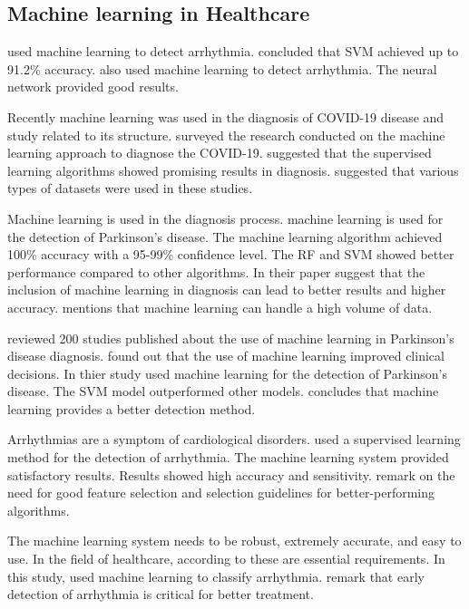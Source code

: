 \subsection{Machine learning in Healthcare}\label{subsec:machine_learning_in_healthcare}

\cite{ref_paper_38} used machine learning to detect arrhythmia. \cite{ref_paper_38} concluded that SVM achieved up to 91.2\% accuracy. \cite{ref_paper_16} also used machine learning to detect arrhythmia. The neural network provided good results.

Recently machine learning was used in the diagnosis of COVID-19 disease and study related to its structure. \cite{ref_paper_20} surveyed the research conducted on the machine learning approach to diagnose the COVID-19. \cite{ref_paper_20} suggested that the supervised learning algorithms showed promising results in diagnosis. \cite{ref_paper_20} suggested that various types of datasets were used in these studies.

Machine learning is used in the diagnosis process. \cite{ref_paper_34} machine learning is used for the detection of Parkinson's disease. The machine learning algorithm achieved 100\% accuracy with a 95-99\% confidence level. The RF and SVM showed better performance compared to other algorithms. In their paper \cite{ref_paper_15} suggest that the inclusion of machine learning in diagnosis can lead to better results and higher accuracy. \cite{ref_paper_15} mentions that machine learning can handle a high volume of data.

\cite{ref_paper_27} reviewed 200 studies published about the use of machine learning in Parkinson's disease diagnosis. \cite{ref_paper_27} found out that the use of machine learning improved clinical decisions. In thier study \cite{ref_paper_30} used machine learning for the detection of Parkinson's disease. The SVM model outperformed other models. \cite{ref_paper_30} concludes that machine learning provides a better detection method.

Arrhythmias are a symptom of cardiological disorders. \cite{ref_paper_28} used a supervised learning method for the detection of arrhythmia. The machine learning system provided satisfactory results. Results showed high accuracy and sensitivity. \cite{ref_paper_28} remark on the need for good feature selection and selection guidelines for better-performing algorithms.

The machine learning system needs to be robust, extremely accurate, and easy to use. In the field of healthcare, according to \cite{ref_paper_4} these are essential requirements. In this study, \cite{ref_paper_4} used machine learning to classify arrhythmia. \cite{ref_paper_4} remark that early detection of arrhythmia is critical for better treatment.

